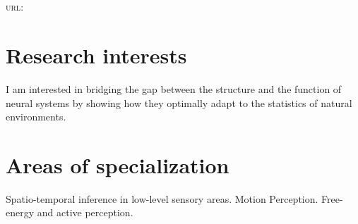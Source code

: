 \documentclass[11pt, a4paper]{article}
\newcommand{\years}[1]{\marginnote{\scriptsize #1}}
\begin{document}
\pagestyle{empty}
\reversemarginpar
\textsf{\Large \Author}\\[1cm]
\Address \\[.2cm]
\textsc{url}: \href{\Website}{\Website}\\
\section*{Research interests}
I am interested in bridging the gap between the structure and the function of neural systems by showing how they optimally adapt to the statistics of natural environments.


\section*{Areas of specialization}
Spatio-temporal inference in low-level sensory areas. %
Motion Perception. %
Free-energy and active perception.

%
%
\end{document}
